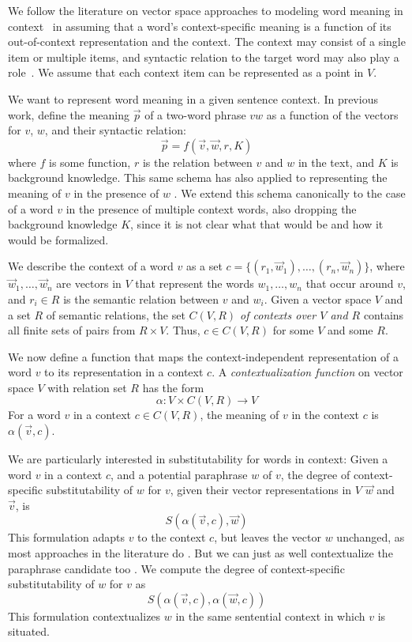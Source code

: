 We follow the literature on vector space approaches to modeling word
meaning in
context~\citep{erk:emnlp08,ThaterFuerstenauPinkal:10,ReisingerMooney:10,dinu-lapata:2010:EMNLP,vandecruys:emnlp2011}
in assuming that a word's context-specific meaning is a function of its
out-of-context representation and the context. The context may consist
of a single item or multiple items, and syntactic relation to the
target word may also play a role~\citep{erk:emnlp08,ThaterFuerstenauPinkal:10,vandecruys:emnlp2011}. We
assume that each context item can be represented as a point in $V$. 


We want to represent word meaning in a given sentence context.
In previous work, \citet{MitchellLapata:08} define the meaning $\vec p$ of a
two-word phrase $vw$ as a function of the vectors for $v$, $w$, and their
syntactic relation:
\[\vec p = f(\vec v, \vec w, r, K) \] where $f$ is some function, $r$ is the
relation between $v$ and $w$ in the text, and $K$ is background knowledge. This
same schema has also applied to representing the meaning of $v$ in the presence
of $w$ \citep{erk:emnlp08}. We extend this schema canonically to the case of a
word $v$ in the presence of multiple context words, also dropping the background
knowledge $K$, since it is not clear what that would be and how it would be
formalized.

We describe the context of a word $v$ as a set $c = \{(r_1, \vec w_1), \ldots,
(r_n, \vec w_n)\}$, where $\vec w_1, \ldots, \vec w_n$ are vectors in $V$ that
represent the words $w_1, \ldots, w_n$ that occur around $v$, and
$r_i \in R$ is the semantic relation between $v$ and $w_i$.
Given a vector space $V$ and a set $R$ of semantic relations, the set
\textit{$C(V, R)$ of contexts over $V$ and $R$} contains all finite sets of
pairs from $R \times V$.  Thus, $c \in C(V,R)$ for some $V$ and some $R$.

We now define a function that maps the context-independent representation of a
word $v$ to its representation in a context $c$.
A \textit{contextualization function} on vector space $V$ with relation set $R$
has the form \[ \alpha: V \times C(V, R) \to V \] For a word $v$ in a context $c
\in C(V, R)$, the meaning of $v$ in the context $c$ is $\alpha(\vec v, c)$.

We are particularly interested in substitutability for words in context: Given a
word $v$ in a context $c$, and a potential paraphrase $w$ of $v$, the degree of
context-specific substitutability of $w$ for $v$, given their vector
representations in $V$ $\vec w$ and $\vec v$, is \[ S(\alpha(\vec v, c), \vec
w)\] This formulation adapts $v$ to the context $c$, but leaves the vector $w$ 
unchanged, as most approaches in the literature do 
\citep{erk:emnlp08,MitchellLapata:08,ThaterFuerstenauPinkal:10,vandecruys:emnlp2011}.
But we can just as well contextualize the paraphrase candidate
too \citep{erk:acl2010}. We compute the degree of context-specific
substitutability of $w$ for $v$ as \[ S(\alpha(\vec v, c), \alpha(\vec w, c)) \]
This formulation contextualizes $w$ in the same sentential context in which $v$
is situated.


